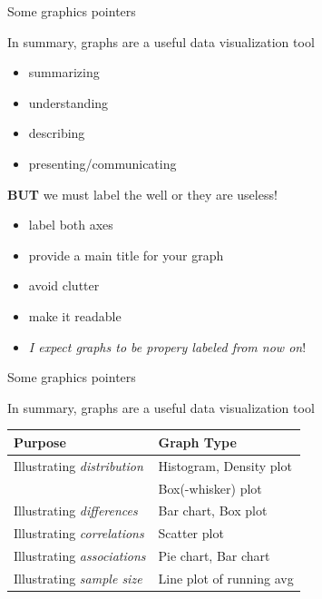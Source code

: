 \documentclass[ignorenonframetext,t]{beamer}
\providecommand{\tightlist}{%
  \setlength{\itemsep}{0pt}\setlength{\parskip}{0pt}}
\begin{document}
\begin{frame}{Some graphics pointers}

In summary, graphs are a useful data visualization tool

\begin{itemize}
\tightlist
\item
  summarizing
\item
  understanding
\item
  describing
\item
  presenting/communicating
\end{itemize}

\textbf{BUT} we must label the well or they are useless!

\begin{itemize}
\tightlist
\item
  label both axes
\item
  provide a main title for your graph
\item
  avoid clutter
\item
  make it readable
\item
  \emph{I expect graphs to be propery labeled from now on}!
\end{itemize}

\end{frame}

\begin{frame}{Some graphics pointers}

In summary, graphs are a useful data visualization tool

\vspace{1cm}

\begin{longtable}[]{@{}ll@{}}
\toprule
Purpose & Graph Type\tabularnewline
\midrule
\endhead
Illustrating \emph{distribution} & Histogram, Density
plot\tabularnewline
& Box(-whisker) plot\tabularnewline
Illustrating \emph{differences} & Bar chart, Box plot\tabularnewline
Illustrating \emph{correlations} & Scatter plot\tabularnewline
Illustrating \emph{associations} & Pie chart, Bar chart\tabularnewline
Illustrating \emph{sample size} & Line plot of running
avg\tabularnewline
\bottomrule
\end{longtable}

\end{frame}
\end{document}
